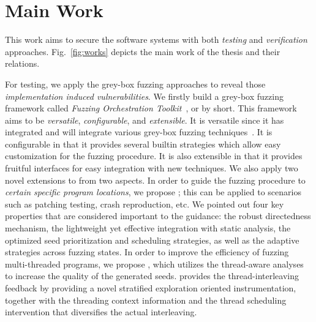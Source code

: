 \section{Main Work}

This work aims to secure the software systems with both \emph{testing} and \emph{verification} approaches. Fig.~\ref{fig:works} depicts the main work of the thesis and their relations.

For testing, we apply the grey-box fuzzing approaches to reveal those \emph{implementation induced vulnerabilities}. We firstly build a grey-box fuzzing framework called \emph{Fuzzing Orchestration Toolkit}~\cite{fse18-fot}, or \FOT by short. This framework aims to be \emph{versatile}, \emph{configurable}, and \emph{extensible}. It is versatile since it has integrated and will integrate various grey-box fuzzing techniques~\cite{Bohme:2016:CGF,Bohme:2017:DGF,redqueen,CollAFL,Angora,fuzz_survey}. It is configurable in that it provides several builtin strategies which allow easy customization for the fuzzing procedure. It is also extensible in that it provides fruitful interfaces for easy integration with new techniques. We also apply two novel extensions to \FOT from two aspects. In order to guide the fuzzing procedure to \emph{certain specific program locations}, we propose \dFOT; this can be applied to scenarios such as patching testing, crash reproduction, etc. We pointed out four key properties that are considered important to the guidance: the robust directedness mechanism, the lightweight yet effective integration with static analysis, the optimized seed prioritization and scheduling strategies, as well as the adaptive strategies across fuzzing states. In order to improve the efficiency of fuzzing multi-threaded programs, we propose \mtfuzz, which utilizes the thread-aware analyses to increase the quality of the generated seeds. \mtfuzz provides the thread-interleaving feedback by providing a novel stratified exploration oriented instrumentation, together with the threading context information and the thread scheduling intervention that diversifies the actual interleaving.

